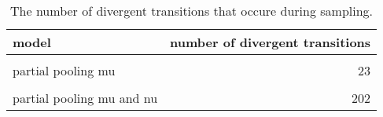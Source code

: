 \begin{table}
\centering
\caption{\label{tab:n_divergent}The number of divergent transitions that occure during sampling.}
\centering
\begin{tabular}[t]{lr}
\toprule
model & number of divergent transitions\\
\midrule
\cellcolor{gray!10}{complete pooling} & \cellcolor{gray!10}{0}\\
partial pooling mu & 23\\
\cellcolor{gray!10}{partial pooling nu} & \cellcolor{gray!10}{110}\\
partial pooling mu and nu & 202\\
\bottomrule
\end{tabular}
\end{table}
